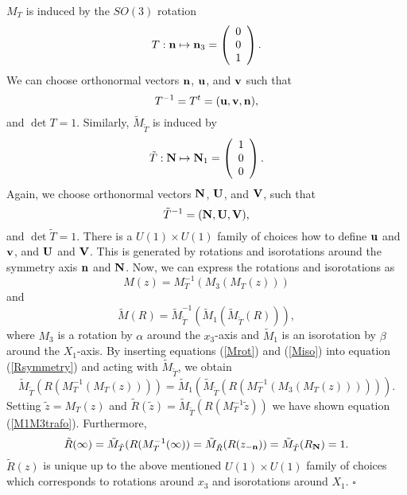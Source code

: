 \documentclass[a4paper,12pt]{article}
\begin{document}
${M_T}$ is induced by the $SO(3)$ rotation 
%
\begin{equation}
T: {\bf n} \mapsto {\bf n}_3 = 
\left(
\begin{array}{c}
0 \\
0 \\
1 
\end{array}
\right).
\end{equation}
%
We can choose orthonormal vectors ${\bf n}$, ${\bf u}$, and ${\bf v}$
such that 
%
\begin{equation}
T^{-1} = T^t = ({\bf u}, {\bf v}, {\bf n}),
\end{equation}
%
and $\det T = 1$. Similarly, ${\tilde M}_{{\tilde T}}$ is induced by
%
\begin{equation}
{\tilde T}: {\bf N} \mapsto {\bf N}_1 = 
\left(
\begin{array}{c}
1 \\
0 \\
0 
\end{array}
\right).
\end{equation}
%
Again, we choose orthonormal vectors ${\bf N}$, ${\bf U}$, and ${\bf V}$, such 
that  
%
\begin{equation}
{\tilde T}^{-1} = ({\bf N}, {\bf U}, {\bf V}),
\end{equation}
%
and $\det {\tilde T} = 1$. There is a $U(1) \times U(1)$ family of choices how 
to define ${\bf u}$ and ${\bf v}$, and ${\bf U}$ and ${\bf V}$. This is 
generated by rotations and isorotations around the symmetry axis ${\bf n}$ and 
${\bf N}$. 
Now, we can express the rotations and isorotations as
%
\begin{equation}
\label{Mrot}
M(z) = M^{-1}_T(M_3(M_T(z)))
\end{equation}
%
and
%
\begin{equation}
\label{Miso}
{\tilde M}(R) = {\tilde M}^{-1}_{{\tilde T}}({\tilde M}_1({\tilde 
M}_{{\tilde T}}(R))),
\end{equation}
%
where $M_3$ is a rotation by $\alpha$ around the $x_3$-axis and ${\tilde M}_1$ 
is an isorotation by $\beta$ around the $X_1$-axis.
By inserting equations (\ref{Mrot}) and (\ref{Miso}) into equation 
(\ref{Rsymmetry}) and acting with ${\tilde M}_{{\tilde T}}$, we obtain
%
\begin{equation}
{\tilde M}_{{\tilde T}}(R(M^{-1}_T (M_T(z))))
=
{\tilde M}_1({\tilde M}_{{\tilde T}}(R(M^{-1}_T(M_3(M_T(z)))))).
\end{equation}
%
Setting ${\tilde z} = M_T(z)$ and ${\tilde R}({\tilde z}) = {\tilde M}_{{\tilde 
T}}(R(M^{-1}_T {\tilde z}))$ we have shown equation 
(\ref{M1M3trafo}).
%
Furthermore,
\begin{equation}
{\tilde R}(\infty) = {\tilde M}_{{\tilde T}}(R(M^{-1}_T (\infty)) 
= {\tilde M}_{{\tilde R}}(R(z_{-{\bf n}})) 
= {\tilde M}_{{\tilde T}}(R_{{\bf N}}) = 1. 
\end{equation}
%
${\tilde R}(z) $ is unique up to the above mentioned $U(1) \times U(1)$ family 
of choices which corresponds to rotations around $x_3$ and isorotations around 
$X_1$. \hfill $\square$ \\
\end{document}

